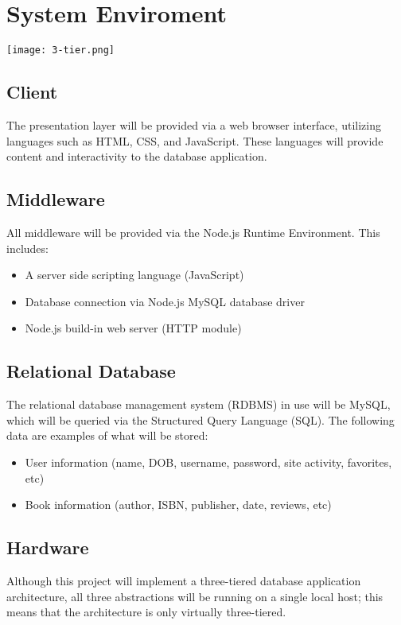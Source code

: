 \documentclass[titlepage]{article}
\begin{document}
	\section{System Enviroment}

	\texttt{[image: 3-tier.png]}

	\subsection{Client}
		The presentation layer will be provided via a web browser interface, utilizing languages such as HTML, CSS, and JavaScript. These languages will provide content and interactivity to the database application.
	\subsection{Middleware}
		All middleware will be provided via the Node.js Runtime Environment. This includes:
	\begin{itemize}
		\item A server side scripting language (JavaScript)
		\item Database connection via Node.js MySQL database driver
		\item Node.js build-in web server (HTTP module)
	\end{itemize}

	\subsection{Relational Database}
		The relational database management system (RDBMS) in use will be MySQL, which will be queried via the Structured Query Language (SQL). The following data are examples of what will be stored:
	\begin{itemize}
		\item User information (name, DOB, username, password, site activity, favorites, etc)
		\item Book information (author, ISBN, publisher, date, reviews, etc)
	\end{itemize}

	\subsection{Hardware}
		Although this project will implement a three-tiered database application architecture, all three abstractions will be running on a single local host; this means that the architecture is only virtually three-tiered.
\end{document}

